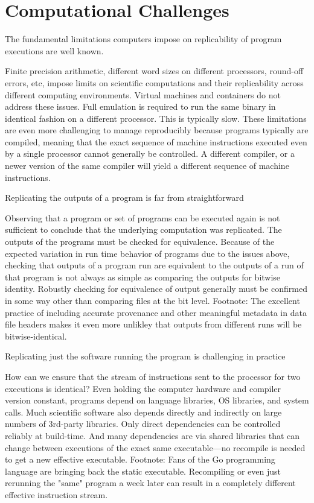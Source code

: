 \section{Computational Challenges}\label{sec-limitations}

		The fundamental limitations computers impose on replicability of program executions are well known.

			Finite precision arithmetic, different word sizes on different processors, round-off errors, etc, impose limits on scientific computations and
				their replicability across different computing environments.
			Virtual machines and containers do not address these issues. Full emulation is required to run the same binary in identical fashion
				on a different processor.  This is typically slow.
			These limitations are even more challenging to manage reproducibly because programs typically are compiled, meaning that the
				exact sequence of machine instructions executed even by a single processor cannot generally be controlled.  A different compiler,
				or a newer version of the same compiler will yield a different sequence of machine instructions.

		Replicating the outputs of a program is far from straightforward

			Observing that a program or set of programs can be executed again is not sufficient to conclude that the underlying computation
				was replicated.  The outputs of the programs must be checked for equivalence.
			Because of the expected variation in run time behavior of programs due to the issues above, checking that outputs of a program
				run are equivalent to the outputs of a run of that program is not always as simple as
				comparing the outputs for bitwise identity.
			Robustly checking for equivalence of output generally must be confirmed in some way other than comparing files at the bit level.
			Footnote: The excellent practice of including accurate provenance and other meaningful metadata in data file headers makes it
				even more unlikley that outputs from different runs will be bitwise-identical.

		Replicating just the software running the program is challenging in practice

			How can we ensure that the stream of instructions sent to the processor for two executions is identical?
			Even holding the computer hardware and compiler version constant, programs depend on language libraries, OS libraries, and system calls.
			Much scientific software also depends directly and indirectly on large numbers of 3rd-party libraries.
			Only direct dependencies can be controlled reliably at build-time.  And many dependencies are via shared libraries that can change between executions
				of the exact same executable---no recompile is needed to get a new effective executable.
			Footnote:  Fans of the Go programming language are bringing back the static executable.
			Recompiling or even just rerunning the "same" program a week later can result in a completely different effective instruction stream.

